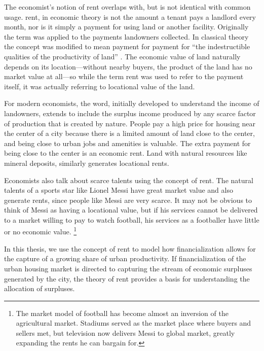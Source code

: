 The economist's notion of rent  overlaps with, but is not identical with common usage. \Gls{rent}, in economic theory is not the amount a tenant pays a landlord every month, nor is it simply a payment for using land or another facility. Originally the term was applied to the payments landowners collected. In classical theory the concept was modified to mean payment for payment for ``the indestructible qualities of the productivity of land'' \cite{Gray1914RentUT}. The economic value of land naturally depends on its location---without  nearby buyers, the product of the land has no market value at all---so while the term rent was used to refer to the payment itself, it was actually referring to locational value of the land. %

For modern economists, the word, initially developed to understand the income of landowners, extends to include the \gls{surplus} income produced by any scarce factor of production that is created by nature. %
People pay a high price for housing near the center of a city because there is a limited amount of land close to the center, and being close to urban jobs and amenities is valuable. The extra payment for being close to the center is an \gls{economic rent}. 
Land with natural resources like mineral deposits, similarly generates locational rents. 

Economists also talk about scarce talents using the concept of rent.  The natural talents of a sports star like Lionel Messi have great market value and  also generate rents, since people like Messi are very scarce. It may not be obvious to think of Messi as having a locational value, but if his services cannot be delivered to a market willing to pay to watch football, his services as a footballer have little or no economic value.%
\footnote{The market model of football has become almost an inversion of the agricultural market. Stadiums served as the market place where buyers and sellers met, but television now delivers Messi to global market, greatly expanding the rents he can bargain for.} 

In this thesis, we use the concept of rent to model how financialization allows for the capture of a growing share of urban productivity. %
If financialization of the urban housing market is directed to capturing the stream of economic surpluses generated by the city, the theory of rent provides a basis for understanding the allocation of surpluses.

